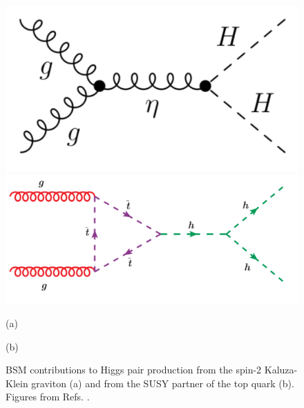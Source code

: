 \begin{figure}
	\centering
	\begin{minipage}{.5\textwidth}
		\centering
		\includegraphics[trim={0cm 0cm 0cm 0cm},clip,width=.7\linewidth]{./Figures/graviton.png}
	\end{minipage}%
	\begin{minipage}{.5\textwidth}
		\centering
		\includegraphics[trim={0cm .5cm 0cm 0cm},clip,width=\linewidth]{./Figures/susy.png}
	\end{minipage}
	\begin{minipage}[t]{0.5\textwidth}
		\caption*{(a)}
	\end{minipage}%
	\hfill
	\begin{minipage}[t]{0.5\textwidth}
		\caption*{(b)}
	\end{minipage}
	\caption{BSM contributions to Higgs pair production from the spin-2 Kaluza-Klein graviton (a) and from the SUSY partner of the top quark (b). Figures from Refs. \cite{hhBSMgrav,hhBSMsusy}.}
	\label{fig:BSM_diag}
\end{figure}


